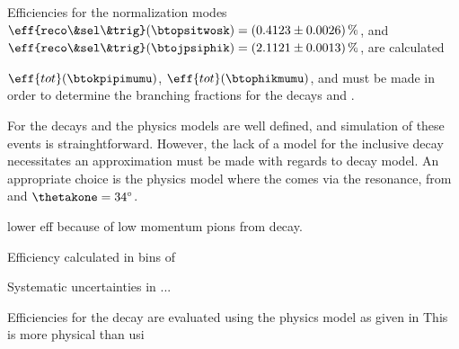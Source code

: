 Efficiencies for the normalization modes
$\eff{reco\&sel\&trig}(\btopsitwosk)=(0.4123\pm0.0026)\,\%$, and
$\eff{reco\&sel\&trig}(\btojpsiphik)=(2.1121\pm0.0013)\,\%$, are calculated


$\eff{tot}(\btokpipimumu)$,
$\eff{tot}(\btophikmumu)$, and
must be made in order to determine the branching fractions for the decays \btokpipimumu and
\btophikmumu.

For the decays \btopsitwosk and \btojpsiphik the physics models are well defined, and simulation of
these events is strainghtforward.
However, the lack of a model for the inclusive decay \btokpipimumu necessitates an approximation
must be made with regards to decay model.
An appropriate choice is the physics model where the \kpipi comes via the  resonance,
from  and $\thetakone=34^\circ$.


\btopsitwosk lower eff because of low momentum pions from \psitwos decay.

Efficiency calculated in bins of \qsq

Systematic uncertainties in ...




Efficiencies for the decay \btokpipimumu are evaluated using the physics model as given in
This is more physical than usi








